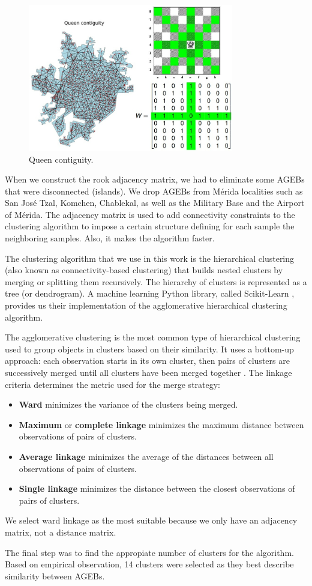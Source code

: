 \begin{figure}[h!]
	\centering
	\includegraphics[width=0.8\textwidth]{Figures/queen-contiguity.jpg}
	\caption{Queen contiguity.
		\label{fig:queen-contiguity}}
\end{figure}

When we construct the rook adjacency matrix, we had to eliminate some AGEBs that were disconnected (islands). We drop AGEBs from Mérida localities such as San José Tzal, Komchen, Chablekal, as well as the Military Base and the Airport of Mérida. The adjacency matrix is used to add connectivity constraints to the clustering algorithm to impose a certain structure defining for each sample the neighboring samples. Also, it makes the algorithm faster.

The clustering algorithm that we use in this work is the hierarchical clustering (also known as connectivity-based clustering) that builds nested clusters by merging or splitting them recursively. The hierarchy of clusters is represented as a tree (or dendrogram). A machine learning Python library, called Scikit-Learn \cite{scikit-learn}, provides us their implementation of the agglomerative hierarchical clustering algorithm. 

The agglomerative clustering is the most common type of hierarchical clustering used to group objects in clusters based on their similarity. It uses a bottom-up approach: each observation starts in its own cluster, then pairs of clusters are successively merged until all clusters have been merged together \cite{hierarchical_scikit}. The linkage criteria determines the metric used for the merge strategy:

\begin{itemize}
	\item \textbf{Ward} minimizes the variance of the clusters being merged.
	\item \textbf{Maximum} or \textbf{complete linkage} minimizes the maximum distance between observations of pairs of clusters.
	\item \textbf{Average linkage} minimizes the average of the distances between all observations of pairs of clusters.
	\item \textbf{Single linkage} minimizes the distance between the closest observations of pairs of clusters.
\end{itemize}

We select ward linkage as the most suitable because we only have an adjacency matrix, not a distance matrix.

The final step was to find the appropiate number of clusters for the algorithm. Based on empirical observation, 14 clusters were selected as they best describe similarity between AGEBs.

